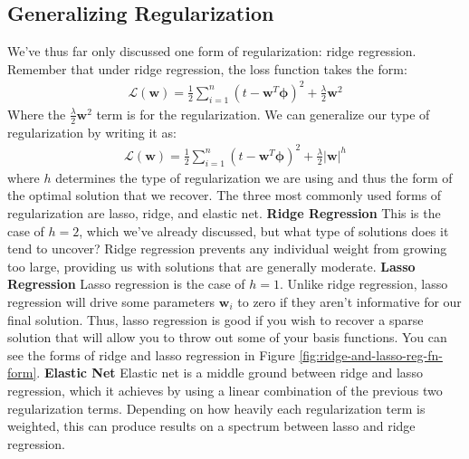 \subsection{Generalizing Regularization}
We've thus far only discussed one form of regularization: ridge regression. Remember that under ridge regression, the loss function takes the form:
\begin{align*}
    \mathcal{L}(\textbf{w}) = \frac{1}{2} \sum_{i=1}^{n} (t - \textbf{w}^{T}\boldsymbol{\phi})^2 + \frac{\lambda}{2}\textbf{w}^{2}
\end{align*}
Where the $\frac{\lambda}{2}\textbf{w}^{2}$ term is for the regularization. We can generalize our type of regularization by writing it as:
\begin{align*}
    \mathcal{L}(\textbf{w}) = \frac{1}{2} \sum_{i=1}^{n} (t - \textbf{w}^{T}\boldsymbol{\phi})^2 + \frac{\lambda}{2}\big|\textbf{w}\big|^{h}
\end{align*}
where $h$ determines the type of regularization we are using and thus the form of the optimal solution that we recover. The three most commonly used forms of regularization are lasso, ridge, and elastic net. \newline \newline
\textbf{Ridge Regression} \newline
This is the case of $h = 2$, which we've already discussed, but what type of solutions does it tend to uncover? Ridge regression prevents any individual weight from growing too large, providing us with solutions that are generally moderate. \newline \newline
\textbf{Lasso Regression} \newline
Lasso regression is the case of $h = 1$. Unlike ridge regression, lasso regression will drive some parameters $\textbf{w}_{i}$ to zero if they aren't informative for our final solution. Thus, lasso regression is good if you wish to recover a sparse solution that will allow you to throw out some of your basis functions. You can see the forms of ridge and lasso regression in Figure \ref{fig:ridge-and-lasso-reg-fn-form}. \newline \newline
\textbf{Elastic Net} \newline
Elastic net is a middle ground between ridge and lasso regression, which it achieves by using a linear combination of the previous two regularization terms. Depending on how heavily each regularization term is weighted, this can produce results on a spectrum between lasso and ridge regression. \\


